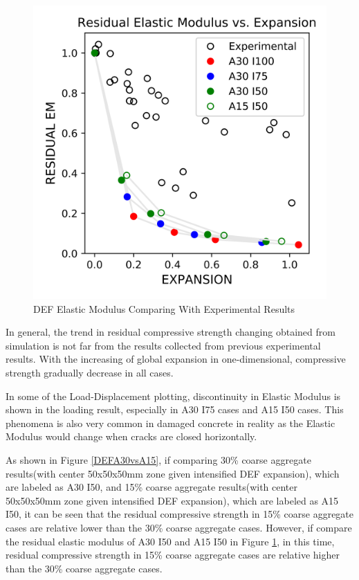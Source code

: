 \begin{figure}[ht!]
\centering
\includegraphics[width=.8\linewidth]{Files/CS_plot/DEFEM_all.png}
  \caption{DEF Elastic Modulus Comparing With Experimental Results}
  \label{DEF_EM_summary}
\end{figure}


In general, the trend in residual compressive strength changing obtained from simulation is not far from the results collected from previous experimental results. With the increasing of global expansion in one-dimensional, compressive strength gradually decrease in all cases.

In some of the Load-Displacement plotting, discontinuity in Elastic Modulus is shown in the loading result, especially in A30 I75 cases and A15 I50 cases. This phenomena is also very common in damaged concrete in reality as the Elastic Modulus would change when cracks are closed horizontally.

As shown in Figure \ref{DEFA30vsA15}, if comparing 30\% coarse aggregate results(with center 50x50x50mm zone given intensified DEF expansion), which are labeled as A30 I50, and 15\% coarse aggregate results(with center 50x50x50mm zone given intensified DEF expansion), which are labeled as A15 I50, it can be seen that the residual compressive strength in 15\% coarse aggregate cases are relative lower than the 30\% coarse aggregate cases. However, if compare the residual elastic modulus of A30 I50 and A15 I50 in Figure \ref{DEF_EM_summary}, in this time, residual compressive strength in 15\% coarse aggregate cases are relative higher than the 30\% coarse aggregate cases.

